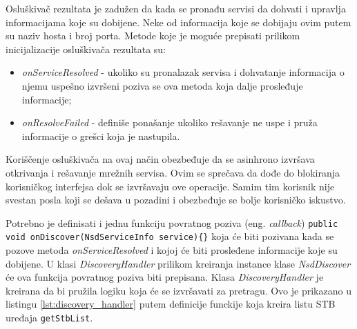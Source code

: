 \documentclass[struktura.tex]{subfiles}
\begin{document}
Osluškivač rezultata je zadužen da kada se pronađu servisi da dohvati i upravlja informacijama koje su dobijene. Neke od informacija koje se dobijaju ovim putem su naziv hosta i broj porta. Metode koje je moguće prepisati prilikom inicijalizacije osluškivača rezultata su:
\begin{itemize}
    \item \textit{onServiceResolved} - ukoliko su pronalazak servisa i dohvatanje informacija o njemu uspešno izvršeni poziva se ova metoda koja dalje prosleđuje informacije;
    \item \textit{onResolveFailed} - definiše ponašanje ukoliko rešavanje ne uspe i pruža informacije o grešci koja je nastupila.
\end{itemize}

Koriščenje osluškivača na ovaj način obezbeđuje da se asinhrono izvršava otkrivanja i rešavanje mrežnih servisa. Ovim se sprečava da dođe do blokiranja korisničkog interfejsa dok se izvršavaju ove operacije. Samim tim korisnik nije svestan posla koji se dešava u pozadini i obezbeđuje se bolje korisničko iskustvo. 

Potrebno je definisati i jednu funkciju povratnog poziva (eng. \textit{callback}) \lstinline!public void onDiscover(NsdServiceInfo service){}! koja će biti pozivana kada se pozove metoda \textit{onServiceResolved} i kojoj će biti prosleđene informacije koje su dobijene.  U klasi \textit{DiscoveryHandler} prilikom kreiranja instance klase \textit{NsdDiscover} će ova funkcija povratnog poziva biti prepisana. Klasa \textit{DiscoveryHandler} je kreirana da bi pružila logiku koja će se izvršavati za pretragu. Ovo je prikazano u listingu \ref{lst:discovery_handler} putem definicije funckije koja kreira listu STB uređaja \verb|getStbList|.


\end{document}

